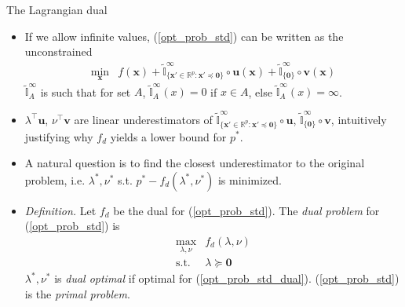\documentclass{beamer}
\numberwithin{equation}{section}
\newcommand{\aref}[1]{\alert{\ref{#1}}}
\begin{document}
\begin{frame}{The Lagrangian dual}
    \begin{itemize}
        \item
        If we allow infinite values, (\aref{opt_prob_std}) can be written as
        the unconstrained
        \begin{equation*}
            \begin{array}{ll}
                \displaystyle\min_\mathbf{x} &
                \displaystyle f(\mathbf{x}) + \tilde{\mathbb{I}}^\infty_{\{
                    \mathbf{x}' \in \mathbb{R}^p : \mathbf{x}' \preceq
                    \mathbf{0}
                \}}\circ\mathbf{u}(\mathbf{x}) +
                \tilde{\mathbb{I}}^\infty_{\{\mathbf{0}\}} \circ
                \mathbf{v}(\mathbf{x})
            \end{array}
        \end{equation*}
        $ \displaystyle\tilde{\mathbb{I}}_A^\infty $  is such that for set
        $ A $, $ \displaystyle\tilde{\mathbb{I}}_A^\infty(x) = 0 $ if
        $ x \in A $, else
        $ \displaystyle\tilde{\mathbb{I}}_A^\infty(x) = \infty $.

        \item
        $ \lambda^\top\mathbf{u} $, $ \nu^\top\mathbf{v} $ are linear
        underestimators of $ \displaystyle\tilde{\mathbb{I}}^\infty_{\{
            \mathbf{x}' \in \mathbb{R}^p : \mathbf{x}' \preceq \mathbf{0}
        \}}\circ\mathbf{u} $, $ \displaystyle
        \tilde{\mathbb{I}}^\infty_{\{\mathbf{0}\}}\circ\mathbf{v} $,
        intuitively justifying why $ f_d $ yields a lower bound for $ p^* $.

        \item
        A natural question is to find the closest underestimator to the
        original problem, i.e. $ \lambda^*, \nu^* $ s.t.
        $ p^* - f_d(\lambda^*, \nu^*) $ is minimized.

        \item
        \textit{Definition.} Let $ f_d $ be the dual for
        (\aref{opt_prob_std}). The \textit{dual problem} for
        (\aref{opt_prob_std}) is
        \begin{equation} \label{opt_prob_std_dual}
            \begin{array}{ll}
                \displaystyle\max_{\lambda, \nu}& f_d(\lambda, \nu) \\
                \text{s.t.} & \lambda\succeq \mathbf{0}
            \end{array}
        \end{equation}
        $ \lambda^*, \nu^* $ is \textit{dual optimal} if optimal for
        (\aref{opt_prob_std_dual}). (\aref{opt_prob_std}) is the
        \textit{primal problem}.
    \end{itemize}

    \bigskip
\end{frame}
\end{document}
